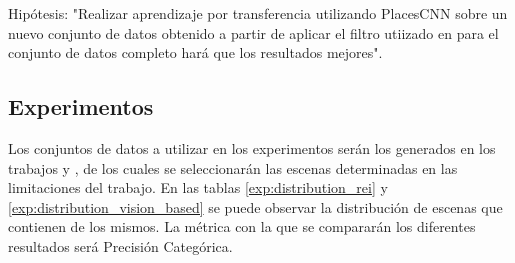 Hipótesis: "Realizar aprendizaje por transferencia utilizando PlacesCNN sobre un nuevo conjunto de datos obtenido a partir de aplicar el filtro utiizado en \cite{lstm_real_estate} para el conjunto de datos completo hará que los resultados mejores".






\subsection{Experimentos}
Los conjuntos de datos a utilizar en los experimentos serán los generados en los trabajos \cite{vision_based_real_estate_price_estimation} y \cite{lstm_real_estate}, de los cuales se seleccionarán las escenas determinadas en las limitaciones del trabajo. En las tablas \ref{exp:distribution_rei} y \ref{exp:distribution_vision_based} se puede observar la distribución de escenas que contienen de los mismos. La métrica con la que se compararán los diferentes resultados será Precisión Categórica.

